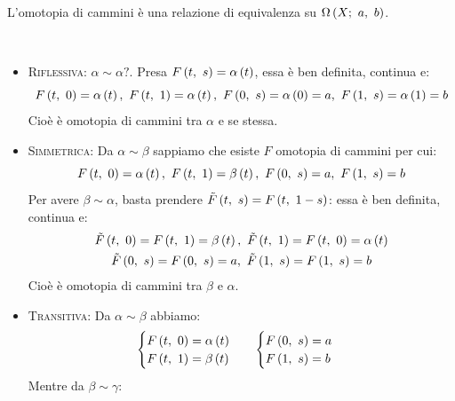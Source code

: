 \begin{observe}
	L'omotopia di cammini è una relazione di equivalenza su $\Omega\left(X;\ a,\ b\right)$.
\end{observe}
\begin{demonstration}~{}
		\begin{itemize}
		\item \textsc{Riflessiva}: $\alpha\sim \alpha ?$. Presa $F\left(t,\ s\right)=\alpha\left(t\right)$, essa è ben definita, continua e:
		\begin{equation*}
			\mvf{F}{t}{0}=\alpha\left(t\right),\ \mvf{F}{t}{1}=\alpha\left(t\right),\ \mvf{F}{0}{s}=\alpha\left(0\right)=a,\ \mvf{F}{1}{s}=\alpha\left(1\right)=b
		\end{equation*}
	Cioè è omotopia di cammini tra $\alpha$ e se stessa.
		\item \textsc{Simmetrica}: Da $\alpha\sim \beta$ sappiamo che esiste $F$ omotopia di cammini per cui:
		\begin{equation*}
			\mvf{F}{t}{0}=\alpha\left(t\right),\ \mvf{F}{t}{1}=\beta\left(t\right),\ \mvf{F}{0}{s}=a,\ \mvf{F}{1}{s}=b
		\end{equation*}
		Per avere $\beta\sim \alpha$, basta prendere $\tilde{F}\left(t,\ s\right)=F\left(t,\ 1-s\right)$: essa è ben definita, continua e:
		\begin{gather*}
			\mvf{\tilde{F}}{t}{0}=\mvf{F}{t}{1}=\beta\left(t\right),\ \mvf{\tilde{F}}{t}{1}=\mvf{F}{t}{0}=\alpha\left(t\right)\\ \mvf{\tilde{F}}{0}{s}=\mvf{F}{0}{s}=a,\ \mvf{\tilde{F}}{1}{s}=\mvf{F}{1}{s}=b
		\end{gather*}
		Cioè è omotopia di cammini tra $\beta$ e $\alpha$.
		\item \textsc{Transitiva}: Da $\alpha\sim \beta$ abbiamo:
	\begin{equation*}
			\begin{array}{ll}
			\begin{cases}
				F\left(t,\ 0\right)=\alpha\left(t\right)\\
				F\left(t,\ 1\right)=\beta\left(t\right)
			\end{cases}&
		\begin{cases}
				F\left(0,\ s\right)=a\\
				F\left(1,\ s\right)=b
		\end{cases}
			\end{array}
	\end{equation*}
Mentre da $\beta\sim \gamma$:
	\begin{equation*}
	\begin{array}{ll}

\end{array}
\end{equation*}
\end{itemize}
\end{demonstration}
